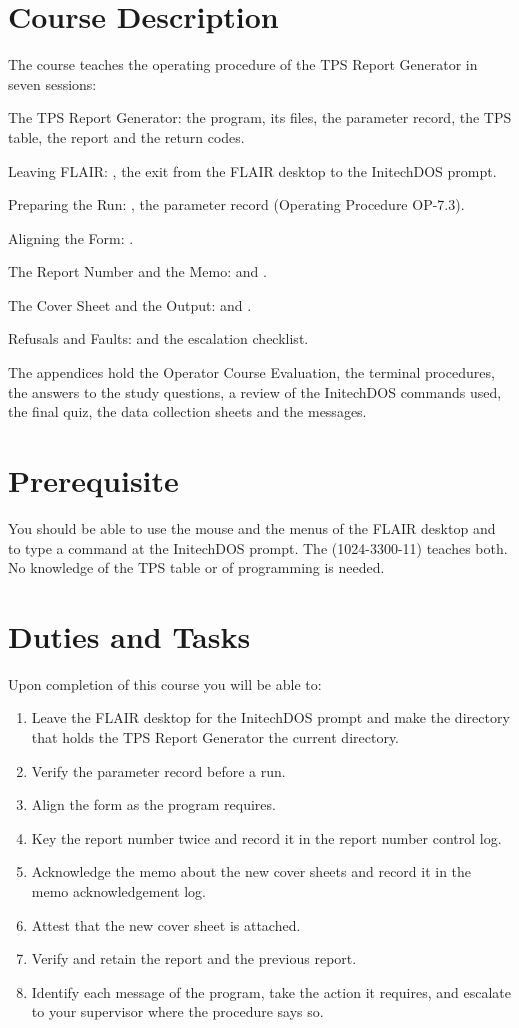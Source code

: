 \section{Course Description}
The course teaches the operating procedure of the TPS Report Generator in
seven sessions:

The TPS Report Generator: the program, its files, the
parameter record, the TPS table, the report and the return codes.

Leaving FLAIR: , the exit from the FLAIR
desktop to the InitechDOS prompt.

Preparing the Run: , the parameter record
(Operating Procedure OP-7.3).

Aligning the Form: .

The Report Number and the Memo:  and
.

The Cover Sheet and the Output:  and .

Refusals and Faults:  and the escalation
checklist.

The appendices hold the Operator Course Evaluation, the terminal
procedures, the answers to the study questions, a review of the InitechDOS
commands used, the final quiz, the data collection sheets and the messages.

\section{Prerequisite}
You should be able to use the mouse and the menus of the FLAIR desktop and
to type a command at the InitechDOS prompt.  The  (1024-3300-11) teaches both.  No knowledge of the TPS table
or of programming is needed.

\section{Duties and Tasks}
Upon completion of this course you will be able to:
\begin{enumerate}
\item Leave the FLAIR desktop for the InitechDOS prompt and make the
  directory that holds the TPS Report Generator the current directory.
\item Verify the parameter record before a run.
\item Align the form as the program requires.
\item Key the report number twice and record it in the report number
  control log.
\item Acknowledge the memo about the new cover sheets and record it in the
  memo acknowledgement log.
\item Attest that the new cover sheet is attached.
\item Verify and retain the report and the previous report.
\item Identify each message of the program, take the action it requires,
  and escalate to your supervisor where the procedure says so.
\end{enumerate}
